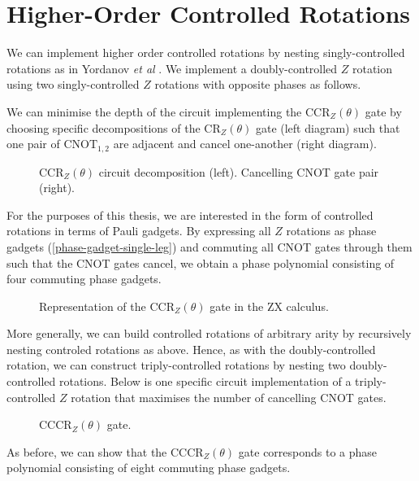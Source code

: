 \section{Higher-Order Controlled Rotations}

We can implement higher order controlled rotations by nesting singly-controlled rotations as in Yordanov \textit{et al} \cite{Yordanov2020}. We implement a doubly-controlled $Z$ rotation using two singly-controlled $Z$ rotations with opposite phases as follows.


We can minimise the depth of the circuit implementing the CCR$_Z(\theta)$ gate by choosing specific decompositions of the CR$_Z(\theta)$ gate (left diagram) such that one pair of $\text{CNOT}_{1, 2}$ are adjacent and cancel one-another (right diagram).

\begin{figure}[H]
    \centering
    \caption{CCR$_Z(\theta)$ circuit decomposition (left). Cancelling CNOT gate pair (right).}
\end{figure}

For the purposes of this thesis, we are interested in the form of controlled rotations in terms of Pauli gadgets. By expressing all $Z$ rotations as phase gadgets (\ref{phase-gadget-single-leg}) and commuting all CNOT gates through them such that the CNOT gates cancel, we obtain a phase polynomial consisting of four commuting phase gadgets.

\begin{figure}[H]
    \centering
    \caption{Representation of the CCR$_Z(\theta)$ gate in the ZX calculus.}
    \label{ccrz}
\end{figure}

More generally, we can build controlled rotations of arbitrary arity by recursively nesting controled rotations as above. Hence, as with the doubly-controlled rotation, we can construct triply-controlled rotations by nesting two doubly-controlled rotations. Below is one specific circuit implementation of a triply-controlled $Z$ rotation that maximises the number of cancelling CNOT gates.

\begin{figure}[H]
    \centering
    \caption{CCCR$_Z(\theta)$ gate.}
\end{figure}

As before, we can show that the CCCR$_Z(\theta)$ gate corresponds to a phase polynomial consisting of eight commuting phase gadgets.


